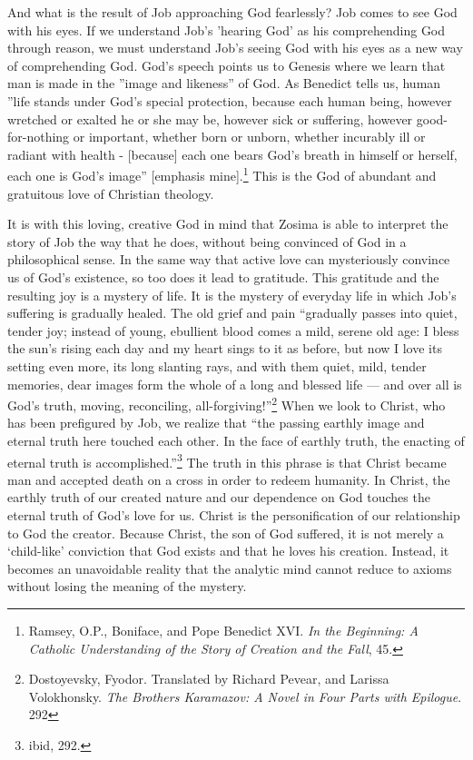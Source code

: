 And what is the result of Job approaching God fearlessly? Job comes to see God with his eyes. If we understand Job's 'hearing God' as his comprehending God through reason, we must understand Job's seeing God with his eyes as a new way of comprehending God. God's speech points us to Genesis where we learn that man is made in the ''image and likeness'' of God. As Benedict tells us, human ''life stands under God's special protection, because each human being, however wretched or exalted he or she may be, however sick or suffering, however good-for-nothing or important, whether born or unborn, whether incurably ill or radiant with health - [because] each one bears God's breath in himself or herself, each one is God's image'' [emphasis mine].\footnote{Ramsey, O.P., Boniface, and Pope Benedict XVI. \emph{In the Beginning: A Catholic Understanding of the Story of Creation and the Fall}, 45.} This is the God of abundant and gratuitous love of Christian theology.

It is with this loving, creative God in mind that Zosima is able to interpret the story of Job the way that  he does, without being convinced of God in a philosophical sense. In the same way that active love can mysteriously convince us of God's existence, so too does it lead to gratitude. This gratitude and the resulting joy is a mystery of life.  It is the mystery of everyday life in which Job's suffering is gradually healed. The old grief and pain ``gradually passes into quiet, tender joy; instead of young, ebullient blood comes a mild, serene old age: I bless the sun's rising each day and my heart sings to it as before, but now I love its setting even more, its long slanting rays, and with them quiet, mild, tender memories, dear images form the whole of a long and blessed life --- and over all is God's truth, moving, reconciling, all-forgiving!''\footnote{Dostoyevsky, Fyodor. Translated by Richard Pevear, and Larissa Volokhonsky. \emph{The Brothers Karamazov: A Novel in Four Parts with Epilogue}. 292} When we look to Christ, who has been prefigured by Job, we realize that ``the passing earthly image and eternal truth here touched each other. In the face of earthly truth, the enacting of eternal truth is accomplished.''\footnote{ibid, 292.}  The truth in this phrase is that Christ became man and accepted death on a cross in order to redeem humanity.  In Christ, the earthly truth of our created nature and our dependence on God touches the eternal truth of God's love for us.  Christ is the personification of our relationship to God the creator.  Because Christ, the son of God suffered, it is not merely a `child-like' conviction that God exists and that he loves his creation. Instead, it becomes an unavoidable reality that the analytic mind cannot reduce to axioms without losing the meaning of the mystery. 

